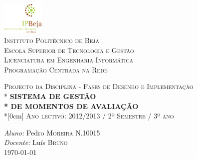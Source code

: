 \begin{titlepage}

\begin{center}

\includegraphics[width=0.15\textwidth]{logo.png}\\[1cm]    


\textsc{\LARGE Instituto Politécnico de Beja\\Escola Superior de Tecnologia e Gestão}\\[1.5cm]
\textsc{Licenciatura em Engenharia Informática}\\
\textsc{Programação Centrada na Rede}




\vspace*{\fill}
\textsc{Projecto da Disciplina - Fases de Desenho e Implementação}\\*
{\huge \bfseries SISTEMA DE GESTÃO\\*
 \bfseries DE MOMENTOS DE AVALIAÇÃO}\\*[0cm]
\textsc{Ano lectivo: 2012/2013 / 2º Semestre / 3º ano}
\vspace*{\fill}


\vfill

{
\emph{Aluno:} Pedro \textsc{Moreira} N.10015\\



\emph{Docente:} Luís \textsc{Bruno}
\\

\large \today

}

\end{center}
\end{titlepage}
